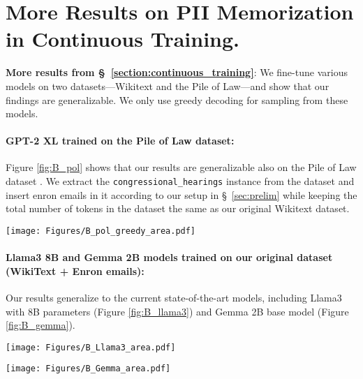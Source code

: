 \section{More Results on PII Memorization in Continuous Training.}
\label{sec:appendix_moreresults_continued}
\textbf{More results from \S~\ref{section:continuous_training}}: We fine-tune various models on two datasets—Wikitext and the Pile of Law—and show that our findings are generalizable. We only use greedy decoding for sampling from these models. 

\paragraph{GPT-2 XL trained on the Pile of Law dataset:} Figure \ref{fig:B_pol} shows that our results are generalizable also on the Pile of Law dataset \citep{henderson2022pile}. We extract the \texttt{congressional\_hearings} instance from the dataset and insert enron emails in it according to our setup in \S~\ref{sec:prelim} while keeping the total number of tokens in the dataset the same as our original Wikitext dataset.  

 
\begin{figure*}[t]
  \texttt{[image: Figures/B\_pol\_greedy\_area.pdf]}  
  \caption {Different memorization categories during continuous training for GPT-2 XL trained on the Pile of Law + Enron emails.}
  \label{fig:B_pol}
\end{figure*}


\paragraph{Llama3 8B and Gemma 2B models trained on our original dataset (WikiText + Enron emails):} Our results generalize to the current state-of-the-art models, including Llama3 with 8B parameters (Figure \ref{fig:B_llama3}) and Gemma 2B base model \citep{team2024gemma} (Figure \ref{fig:B_gemma}). 

\begin{figure*}[t]
  \texttt{[image: Figures/B\_Llama3\_area.pdf]}  
  \caption {Different memorization categories during continuous training for Llama3 8B trained on WikiText + Enron emails.}
  \label{fig:B_llama3}
\end{figure*}

 
\begin{figure*}[t]
  \texttt{[image: Figures/B\_Gemma\_area.pdf]}  
  \caption {Different memorization categories during continuous training for Gemma 2B trained on WikiText + Enron emails.}
  \label{fig:B_gemma}
\end{figure*}


